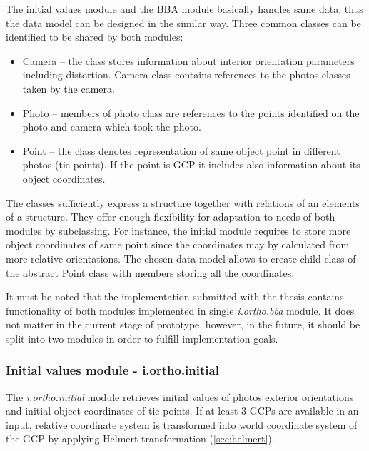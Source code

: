 \documentclass[a4paper,12pt]{article}
\newcommand{\term}[1]{%
{\it #1}%
}
\begin{document}
The initial values module and the BBA module basically handles  same data, thus 
the data model can be designed in the similar way. 
Three common classes can be identified to be shared by both modules:
\begin{itemize}
\item Camera -- the class stores information about interior orientation 
parameters including distortion. Camera class contains references to the photos
classes taken by the camera.
\item Photo -- members of photo class are references to the points identified 
	    on the photo and camera which took the photo.
\item Point -- the class denotes representation of same object point in different photos (tie points).
 If the point is GCP it includes also information about its object coordinates. 
\end{itemize}

The classes sufficiently express a structure together with relations of an elements of a structure.
They offer enough flexibility for adaptation to needs of both modules by subclassing. 
For instance, the initial module requires to store more object coordinates of same point 
since the coordinates may by calculated from more relative orientations. The chosen data model allows 
to create child class of the abstract Point class with members storing all the coordinates. 

It must be noted that the implementation submitted with the thesis contains functionality of both modules
implemented in single  \term{i.ortho.bba} module. 
It does not matter in the current stage of prototype, however, in the future, it should be split into two modules 
in order to fulfill implementation goals.  

\subsubsection{Initial values module - i.ortho.initial}


The \term{i.ortho.initial} module retrieves initial values of photos exterior orientations and 
initial object coordinates of tie points. If at least 3 GCPs are 
available in an input, relative coordinate system
is transformed into world coordinate system of the GCP by applying Helmert transformation (\ref{sec:helmert}). 
\end{document}
